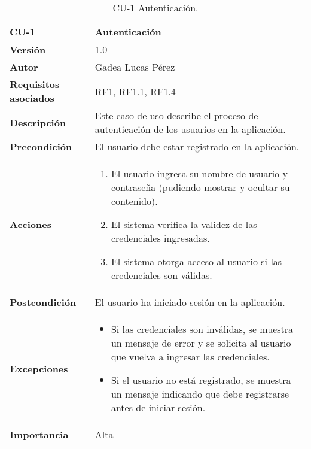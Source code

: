 \begin{table}[p]
\centering
\begin{tabularx}{\linewidth}{ p{} p{} }
\toprule
\textbf{CU-1} & \textbf{Autenticación}\\
\toprule
\textbf{Versión} & 1.0 \\
\textbf{Autor} & Gadea Lucas Pérez \\
\textbf{Requisitos asociados} & RF1, RF1.1, RF1.4  \\
\textbf{Descripción} & Este caso de uso describe el proceso de autenticación de los usuarios en la aplicación.\\
\textbf{Precondición} & El usuario debe estar registrado en la aplicación.\\
\textbf{Acciones} &
\begin{enumerate}
\def\labelenumi{\arabic{enumi}.}
\tightlist
\item El usuario ingresa su nombre de usuario y contraseña (pudiendo mostrar y ocultar su contenido).
\item El sistema verifica la validez de las credenciales ingresadas.
\item El sistema otorga acceso al usuario si las credenciales son válidas.
\end{enumerate}\\
\textbf{Postcondición} & El usuario ha iniciado sesión en la aplicación.\\
\textbf{Excepciones} &
\begin{itemize}
\item Si las credenciales son inválidas, se muestra un mensaje de error y se solicita al usuario que vuelva a ingresar las credenciales.
\item Si el usuario no está registrado, se muestra un mensaje indicando que debe registrarse antes de iniciar sesión.
\end{itemize}\\
\textbf{Importancia} & Alta\\
\bottomrule
\end{tabularx}
\caption{CU-1 Autenticación.}
\label{tab:cu1}
\end{table}


